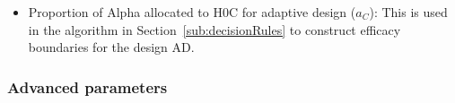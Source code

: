\documentclass[article]{jss}
\begin{document}
\begin{itemize}
\item Proportion of Alpha allocated to H0C for adaptive design ($a_C$): This is used in the algorithm in Section~\ref{sub:decisionRules} to construct efficacy boundaries for the design AD.


\end{itemize}

\subsubsection{Advanced parameters}
\label{sub:advanced-parameters}
\end{document}
